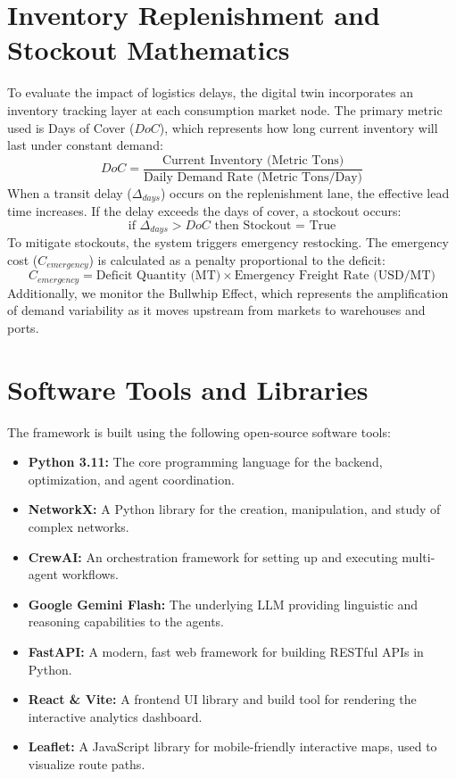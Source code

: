 \section{Inventory Replenishment and Stockout Mathematics}
To evaluate the impact of logistics delays, the digital twin incorporates an inventory tracking layer at each consumption market node. The primary metric used is Days of Cover ($DoC$), which represents how long current inventory will last under constant demand:
\begin{equation}
    DoC = \frac{\text{Current Inventory (Metric Tons)}}{\text{Daily Demand Rate (Metric Tons/Day)}}
\end{equation}
When a transit delay ($\Delta_{days}$) occurs on the replenishment lane, the effective lead time increases. If the delay exceeds the days of cover, a stockout occurs:
\begin{equation}
    \text{if } \Delta_{days} > DoC \text{ then Stockout = True}
\end{equation}
To mitigate stockouts, the system triggers emergency restocking. The emergency cost ($C_{emergency}$) is calculated as a penalty proportional to the deficit:
\begin{equation}
    C_{emergency} = \text{Deficit Quantity (MT)} \times \text{Emergency Freight Rate (USD/MT)}
\end{equation}
Additionally, we monitor the Bullwhip Effect, which represents the amplification of demand variability as it moves upstream from markets to warehouses and ports.

\section{Software Tools and Libraries}
The framework is built using the following open-source software tools:
\begin{itemize}
    \item \textbf{Python 3.11:} The core programming language for the backend, optimization, and agent coordination.
    \item \textbf{NetworkX:} A Python library for the creation, manipulation, and study of complex networks.
    \item \textbf{CrewAI:} An orchestration framework for setting up and executing multi-agent workflows.
    \item \textbf{Google Gemini Flash:} The underlying LLM providing linguistic and reasoning capabilities to the agents.
    \item \textbf{FastAPI:} A modern, fast web framework for building RESTful APIs in Python.
    \item \textbf{React \& Vite:} A frontend UI library and build tool for rendering the interactive analytics dashboard.
    \item \textbf{Leaflet:} A JavaScript library for mobile-friendly interactive maps, used to visualize route paths.
\end{itemize}


